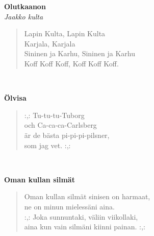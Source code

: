 %
%
\noindent\begin{minipage}{\linewidth}
\vspace{5pt}
\parbox[t]{0.85\linewidth}{\raggedright {\large\bf Olutkaanon}\\[2pt]\small\emph{Jaakko kulta}\\[6pt]}
\begin{verse}
	
	Lapin Kulta, Lapin Kulta\\
	Karjala, Karjala\\
	Sininen ja Karhu, Sininen ja Karhu\\
	Koff Koff Koff, Koff Koff Koff.\\
\end{verse}
\end{minipage}\\[10pt]
%
%
\noindent\begin{minipage}{\linewidth}
\vspace{5pt}
\parbox[t]{0.85\linewidth}{\raggedright {\large\bf Ölvisa}\\[6pt]}
\begin{verse}
	\hspace{0pt-\widthof{:,: }}:,: Tu-tu-tu-Tuborg\\
	och Ca-ca-ca-Carlsberg\\
	är de bästa pi-pi-pi-pilsner,\\
	som jag vet. :,:\\
\end{verse}
\end{minipage}\\[10pt]
%
%
\noindent\begin{minipage}{\linewidth}
\vspace{5pt}
\parbox[t]{0.85\linewidth}{\raggedright {\large\bf Oman kullan silmät}\\[6pt]}
\begin{verse}
	Oman kullan silmät sinisen on harmaat,\\
	ne on minun mielessäni aina.\\
	\hspace{0pt-\widthof{:,: }}:,: Joka sunnuntaki, väliin viikollaki,\\
	aina kun vain silmäni kiinni painan. :,:\\
\end{verse}
\end{minipage}\\[10pt]
